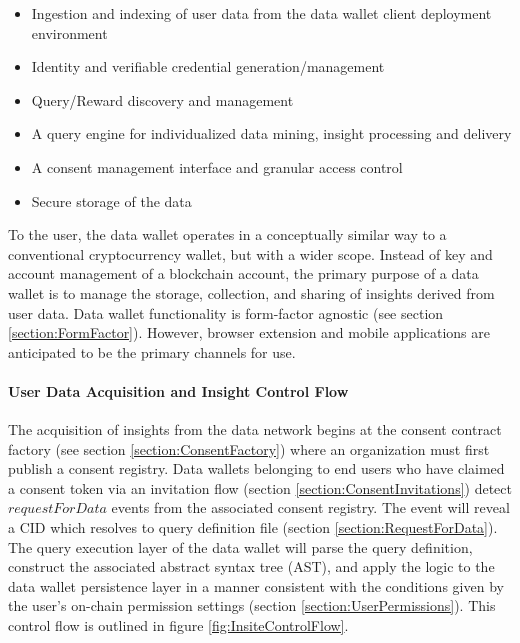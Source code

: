 \begin{itemize}
  \item Ingestion and indexing of user data from the data wallet client deployment environment
  \item Identity and verifiable credential generation/management
  \item Query/Reward discovery and management
  \item A query engine for individualized data mining, insight processing and delivery
  \item A consent management interface and granular access control
  \item Secure storage of the data
\end{itemize}

To the user, the data wallet operates in a conceptually similar way to a conventional cryptocurrency wallet, but with a wider scope. 
Instead of key and account management of a blockchain account, the primary purpose of a data wallet is to manage the storage, collection, and sharing of insights derived 
from user data. Data wallet functionality is form-factor agnostic (see section \ref{section:FormFactor}). However, browser extension and 
mobile applications are anticipated to be the primary channels for use.

\paragraph{User Data Acquisition and Insight Control Flow}
\label{section:AquisitionControlFlow}



The acquisition of insights from the data network begins at the consent contract factory (see section \ref{section:ConsentFactory}) where an organization 
must first publish a consent registry. Data wallets belonging to end users who have claimed a consent token via an invitation flow (section \ref{section:ConsentInvitations})
detect $requestForData$ events from the associated consent registry. The event will reveal a CID which resolves to query definition file (section \ref{section:RequestForData}). 
The query execution layer of the data wallet will parse the query definition, construct the associated abstract syntax tree (AST), and apply the logic to the
data wallet persistence layer in a manner consistent with the conditions given by the user's on-chain permission settings (section \ref{section:UserPermissions}). This
control flow is outlined in figure \ref{fig:InsiteControlFlow}.


